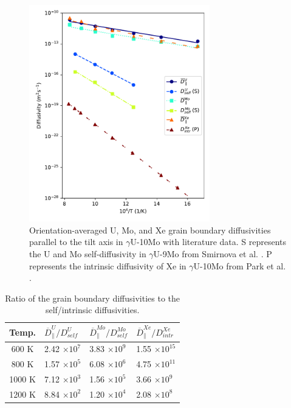 \documentclass{elsarticle}
\begin{document}
\begin{figure}[!ht]
\centering
\includegraphics[width=0.70\textwidth]{newLitComp.pdf}
\caption{Orientation-averaged U, Mo, and Xe grain boundary diffusivities parallel to the tilt axis in $\gamma$U-10Mo with literature data. S represents the U and Mo self-diffusivity in $\gamma$U-9Mo from Smirnova et al. \cite{smirnova2015}. P represents the intrinsic diffusivity of Xe in $\gamma$U-10Mo from Park et al. \cite{park2023}.}
\label{fig:umoxe}
\end{figure}

\begin{table}[!ht]
\centering
\caption{Ratio of the grain boundary diffusivities to the self/intrinsic diffusivities.}
\label{tab:enhance}
\begin{tabular}{clll}
\toprule
Temp.  & $\overline{D}^U_{\parallel}/D^U_{self}$
       & $\overline{D}^{Mo}_{\parallel}/D^{Mo}_{self}$
       & $\overline{D}^{Xe}_{\parallel}/D^{Xe}_{intr}$ \\
\midrule
600 K  & 2.42 $\times 10^7$ & 3.83 $\times 10^9$ & 1.55 $\times 10^{15}$ \\
800 K  & 1.57 $\times 10^5$ & 6.08 $\times 10^6$ & 4.75 $\times 10^{11}$ \\
1000 K & 7.12 $\times 10^3$ & 1.56 $\times 10^5$ & 3.66 $\times 10^9$  \\
1200 K & 8.84 $\times 10^2$ & 1.20 $\times 10^4$ & 2.08 $\times 10^8$  \\
\bottomrule
\end{tabular}
\end{table}
\end{document}
